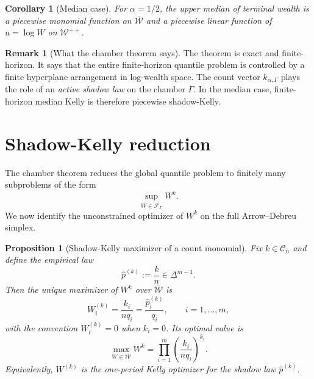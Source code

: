 \documentclass[11pt]{article}
\newtheorem{proposition}[proposition]{Proposition}
\newtheorem{corollary}[corollary]{Corollary}
\theoremstyle{definition}
\newtheorem{remark}[remark]{Remark}
\newcommand{\1}{\mathbf{1}}
\begin{document}
\begin{corollary}[Median case]\label{cor:median-case}
For $\alpha=1/2$, the upper median of terminal wealth is a piecewise monomial function on $\overline{\mathcal W}$ and a piecewise linear function of $u=\log W$ on $\mathcal W^{++}$.
\end{corollary}

\begin{remark}[What the chamber theorem says]
The theorem is exact and finite-horizon. It says that the entire finite-horizon quantile problem is controlled by a finite hyperplane arrangement in log-wealth space. The count vector $k_{\alpha,\Gamma}$ plays the role of an \emph{active shadow law} on the chamber $\Gamma$. In the median case, finite-horizon median Kelly is therefore piecewise shadow-Kelly.
\end{remark}

\section{Shadow-Kelly reduction}

The chamber theorem reduces the global quantile problem to finitely many subproblems of the form
\[
\sup_{W\in\overline{\mathcal F_\Gamma}} W^k.
\]
We now identify the unconstrained optimizer of $W^k$ on the full Arrow--Debreu simplex.

\begin{proposition}[Shadow-Kelly maximizer of a count monomial]\label{prop:monomial-max}
Fix $k\in\mathcal C_n$ and define the empirical law
\[
\widehat p^{(k)}:=\frac{k}{n}\in\Delta^{m-1}.
\]
Then the unique maximizer of $W^k$ over $\overline{\mathcal W}$ is
\begin{equation}\label{eq:shadow-kelly-candidate}
W^{(k)}_i=\frac{k_i}{nq_i}=\frac{\widehat p^{(k)}_i}{q_i},
\qquad i=1,\dots,m,
\end{equation}
with the convention $W^{(k)}_i=0$ when $k_i=0$. Its optimal value is
\begin{equation}\label{eq:monomial-opt-value}
\max_{W\in\overline{\mathcal W}} W^k
=
\prod_{i=1}^m\left(\frac{k_i}{nq_i}\right)^{k_i}.
\end{equation}
Equivalently, $W^{(k)}$ is the one-period Kelly optimizer for the shadow law $\widehat p^{(k)}$.
\end{proposition}
\end{document}
